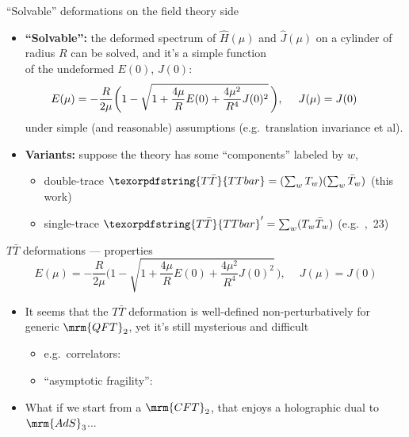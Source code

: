 \documentclass[
	10pt
	,noamsthm
]{beamer}
\newcommand{\TTbar}{\texorpdfstring{\ensuremath{T\bar{T}}}{TTbar}\xspace}
\begin{document}
\begin{frame}{``Solvable'' deformations on the field theory side}{%
	\citeTTbar
}
\begin{itemize}

\item \textbf{``Solvable'':} the deformed spectrum of $\hat{H}(\mu)$ and $\hat{J}(\mu)$ on a cylinder of radius $R$ can be solved, 
and it's a simple function\\
 of the undeformed $E(0)$, $J(0)$:
\begin{equation}
\hspace{-2em}
	E(\mu) = - \frac{R }{ 2\mu } \bigg(1-\sqrt{1 + \frac{4\mu}{R} E(0) + \frac{4\mu^2}{R^4} J(0)^2 }
	\,\bigg), \ \quad J(\mu)=J(0) %
\end{equation}
under simple (and reasonable) assumptions (e.g.~translation invariance et al). 

\item \textbf{Variants:} suppose the theory has some ``components'' labeled by $w$,

\pause

\begin{itemize}
\item double-trace $\TTbar = (\sum_w T_w) (\sum_w \bar{T}_w)$ (this work)
\item single-trace $\TTbar' = \sum_w (T_w \bar{T}_w)$ (e.g.~\textit{\citeauthor{Cui:2023jrb}},~23)
\end{itemize}

\end{itemize}

\vspace{.5\baselineskip}
\end{frame}

\begin{frame}{\TTbar deformations --- properties}{%
	\textcite{Zamolodchikov:2004ce}\\
}
\vspace{-1.\baselineskip}
\begin{equation}
	E(\mu) = - \frac{R }{ 2\mu } \bigg(1-\sqrt{1 + \frac{4\mu}{R} E(0) + \frac{4\mu^2}{R^4} J(0)^2 }
	\,\bigg), \ \quad J(\mu)=J(0)  \label{ttbarspectrum}
\end{equation}
\vspace{-\baselineskip}
\begin{itemize}
\item It seems that the \TTbar deformation is well-defined non-perturbatively for generic $\mrm{QFT}_2$,
yet it's still mysterious and difficult\\
\begin{itemize}
\item e.g.~correlators: \textcite{Kraus:2018xrn,Cardy:2019qao,Cui:2023jrb}
\item ``asymptotic fragility'': \textcite{Dubovsky:2017cnj}
\end{itemize}

\pause
\item What if we start from a $\mrm{CFT}_2$, that enjoys a holographic dual to $\mrm{AdS}_3$...

\end{itemize}
\end{frame}
\end{document}
